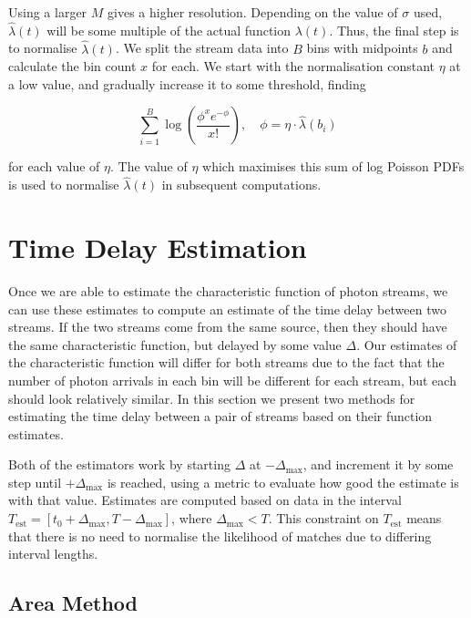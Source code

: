 \documentclass[11pt]{article}
\begin{document}
   Using a larger $M$ gives a higher resolution. Depending on the value of
   $\sigma$ used, $\hat{\lambda}(t)$ will be some multiple of the actual
   function $\lambda(t)$. Thus, the final step is to normalise
   $\hat{\lambda}(t)$. We split the stream data into $B$ bins with midpoints $b$
   and calculate the bin count $x$ for each. We start with the normalisation
   constant $\eta$ at a low value, and gradually increase it to some threshold,
   finding

   \begin{equation}\label{eq:normcalc}
   \sum_{i=1}^B
   \log\left(\frac{\phi^xe^{-\phi}}{x!}\right), \quad \phi=\eta\cdot\hat{\lambda}(b_i)
   \end{equation}

   for each value of $\eta$. The value of $\eta$ which maximises this sum of log
   Poisson PDFs is used to normalise $\hat{\lambda}(t)$ in subsequent
   computations.
\section{Time Delay Estimation}
\label{sec-4}

  Once we are able to estimate the characteristic function of photon streams, we
  can use these estimates to compute an estimate of the time delay between two
  streams. If the two streams come from the same source, then they should have
  the same characteristic function, but delayed by some value $\Delta$. Our
  estimates of the characteristic function will differ for both streams due to
  the fact that the number of photon arrivals in each bin will be different for
  each stream, but each should look relatively similar. In this section we
  present two methods for estimating the time delay between a pair of streams
  based on their function estimates.

  Both of the estimators work by starting $\Delta$ at $-\Delta_{\text{max}}$,
  and increment it by some step until $+\Delta_{\text{max}}$ is reached, using a
  metric to evaluate how good the estimate is with that value. Estimates are
  computed based on data in the interval
  $T_{\text{est}}=[t_0+\Delta_{\text{max}}, T-\Delta_{\text{max}}]$, where
  $\Delta_{\text{max}}<T$. This constraint on $T_{\text{est}}$ means that there
  is no need to normalise the likelihood of matches due to differing interval
  lengths.
\subsection{Area Method}
\label{sec-4.1}
\end{document}
